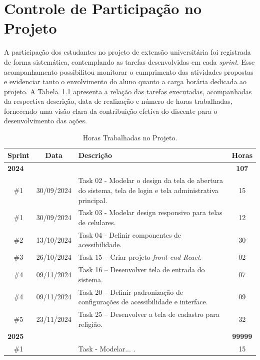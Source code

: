 \chapter{Controle de Participação no Projeto}
	
A participação dos estudantes no projeto de extensão universitária foi registrada de forma sistemática, contemplando as tarefas desenvolvidas em cada \textit{sprint}. Esse acompanhamento possibilitou monitorar o cumprimento das atividades propostas e evidenciar tanto o envolvimento do aluno quanto a carga horária dedicada ao projeto. A Tabela~\ref{Tab:TabHoras} apresenta a relação das tarefas executadas, acompanhadas da respectiva descrição, data de realização e número de horas trabalhadas, fornecendo uma visão clara da contribuição efetiva do discente para o desenvolvimento das ações.

\begin{table}[h!]
	\centering
	\caption{Horas Trabalhadas no Projeto.}
	\label{Tab:TabHoras}
	\renewcommand{\arraystretch}{1.3}
	\setlength{\tabcolsep}{8pt}
	\begin{tabular}{c c p{9cm} c}
		\toprule
		\textbf{Sprint} & \textbf{Data} & \textbf{Descrição} & \textbf{Horas} \\
		\midrule
		\multicolumn{3}{l}{\textbf{2024}} & \textbf{107} \\
		\midrule
		\#1 & 30/09/2024 & Task 02 - Modelar o design da tela de abertura do sistema, tela de login e tela administrativa principal. & 15 \\
		\#1 & 30/09/2024 & Task 03 - Modelar design responsivo para telas de celulares. & 12 \\
		\#2 & 13/10/2024 & Task 04 - Definir componentes de acessibilidade. & 30 \\
		\#3 & 26/10/2024 & Task 15 – Criar projeto \textit{front-end React}. & 02 \\
		\#4 & 09/11/2024 & Task 16 – Desenvolver tela de entrada do sistema. & 07 \\
		\#4 & 09/11/2024 & Task 20 – Definir padronização de configurações de acessibilidade e interface. & 09 \\
		\#5 & 23/11/2024 & Task 25 – Desenvolver a tela de cadastro para religião. & 32 \\
		\bottomrule
		\multicolumn{3}{l}{\textbf{2025}} & \textbf{99999} \\
		\midrule
		\#1 &  & Task  - Modelar... . & 15 \\
		\bottomrule
	\end{tabular}
\end{table}
	
